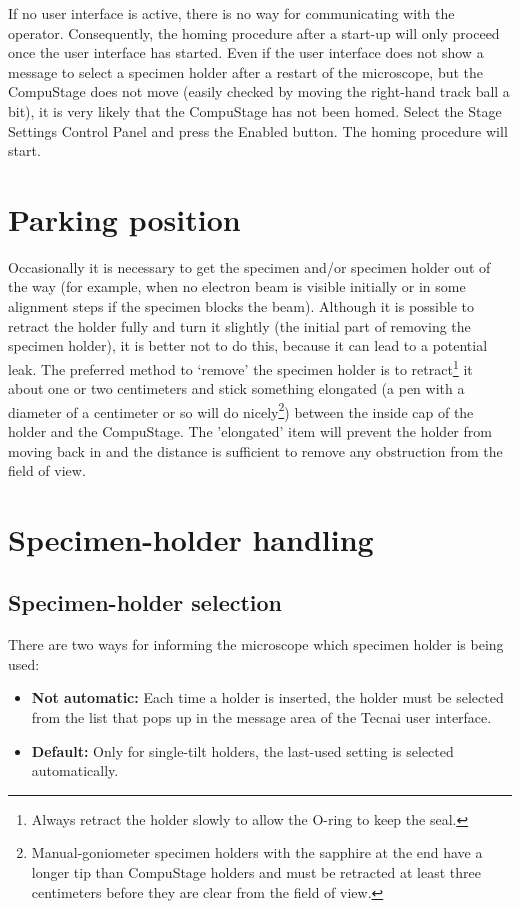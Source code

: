\documentclass[12pt]{article}
\begin{document}
If no user interface is active, there is no way for communicating with
the operator. Consequently, the homing procedure after a start-up will
only proceed once the user interface has started. Even if the user
interface does not show a message to select a specimen holder after a
restart of the microscope, but the CompuStage does not move (easily
checked by moving the right-hand track ball a bit), it is very likely
that the CompuStage has not been homed. Select the Stage Settings
Control Panel and press the Enabled button. The homing procedure will
start.

\section{Parking position}

Occasionally it is necessary to get the specimen and/or specimen holder
out of the way (for example, when no electron beam is visible initially
or in some alignment steps if the specimen blocks the beam).
Although it is possible to retract the holder fully and turn it slightly
(the initial part of removing the specimen holder), it is better not to
do this, because it can lead to a potential leak. The preferred method
to `remove' the specimen holder is to retract\footnote{Always retract
the holder slowly to allow the O-ring to keep the seal.} it about one
or two centimeters and stick something elongated (a pen with a diameter
of a centimeter or so will do nicely\footnote{Manual-goniometer specimen
holders with the sapphire at the end have a longer tip than CompuStage
holders and must be retracted at least three centimeters before they
are clear from the field of view.}) between the inside cap of the
holder and the CompuStage. The 'elongated' item will prevent the holder
from moving back in and the distance is sufficient to remove any
obstruction from the field of view.

\section{Specimen-holder handling}

\subsection{Specimen-holder selection}

There are two ways for informing the microscope which specimen holder
is being used:
\begin{itemize}
\item \textbf{Not automatic:} Each time a holder is inserted, the
holder must be selected from the list that pops up in the message area
of the Tecnai user interface.

\item \textbf{Default:} Only for single-tilt holders, the last-used
setting is selected automatically.
\end{itemize}
\end{document}

